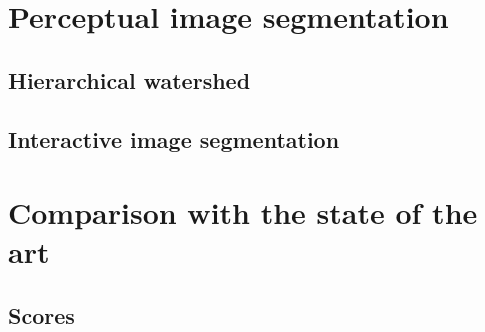 
\section{Perceptual image segmentation}
\subsection{Hierarchical watershed}
\subsection{Interactive image segmentation}



\section{Comparison with the state of the art}
\subsection{Scores}

